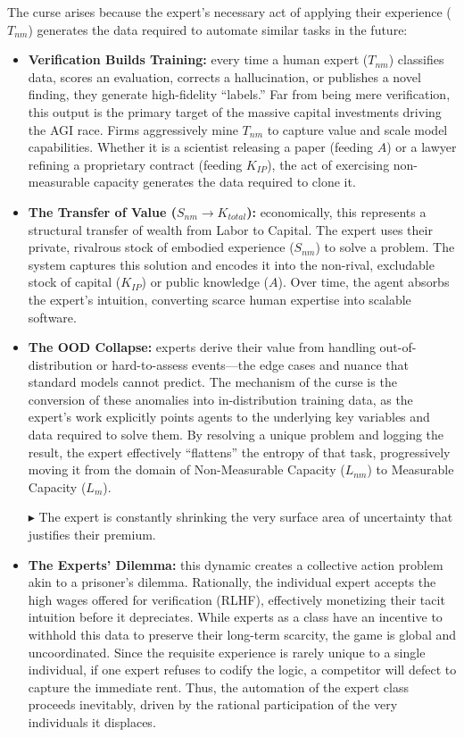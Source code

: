 \documentclass[12pt, letter]{article}
\begin{document}
The curse arises because the expert's necessary act of applying their experience ($T_{nm}$) generates the data required to automate similar tasks in the future:

\begin{itemize}
    \item \textbf{Verification Builds Training:} every time a human expert ($T_{nm}$) classifies data, scores an evaluation, corrects a hallucination, or publishes a novel finding, they generate high-fidelity ``labels.'' Far from being mere verification, this output is the primary target of the massive capital investments driving the AGI race. Firms aggressively mine $T_{nm}$ to capture value and scale model capabilities. Whether it is a scientist releasing a paper (feeding $A$) or a lawyer refining a proprietary contract (feeding $K_{IP}$), the act of exercising non-measurable capacity generates the data required to clone it.

    \item \textbf{The Transfer of Value ($S_{nm} \to K_{total}$):} economically, this represents a structural transfer of wealth from Labor to Capital. The expert uses their private, rivalrous stock of embodied experience ($S_{nm}$) to solve a problem. The system captures this solution and encodes it into the non-rival, excludable stock of capital ($K_{IP}$) or public knowledge ($A$). Over time, the agent absorbs the expert's intuition, converting scarce human expertise into scalable software.

    \item \textbf{The OOD Collapse:} experts derive their value from handling out-of-distribution or hard-to-assess events—the edge cases and nuance that standard models cannot predict. The mechanism of the curse is the conversion of these anomalies into in-distribution training data, as the expert's work explicitly points agents to the underlying key variables and data required to solve them. By resolving a unique problem and logging the result, the expert effectively ``flattens'' the entropy of that task, progressively moving it from the domain of Non-Measurable Capacity ($L_{nm}$) to Measurable Capacity ($L_m$). 
    
    $\blacktriangleright$ The expert is constantly shrinking the very surface area of uncertainty that justifies their premium.

    \item \textbf{The Experts' Dilemma:} this dynamic creates a collective action problem akin to a prisoner's dilemma. Rationally, the individual expert accepts the high wages offered for verification (RLHF), effectively monetizing their tacit intuition before it depreciates. While experts as a class have an incentive to withhold this data to preserve their long-term scarcity, the game is global and uncoordinated. Since the requisite experience is rarely unique to a single individual, if one expert refuses to codify the logic, a competitor will defect to capture the immediate rent. Thus, the automation of the expert class proceeds inevitably, driven by the rational participation of the very individuals it displaces.

\end{itemize}
\end{document}
